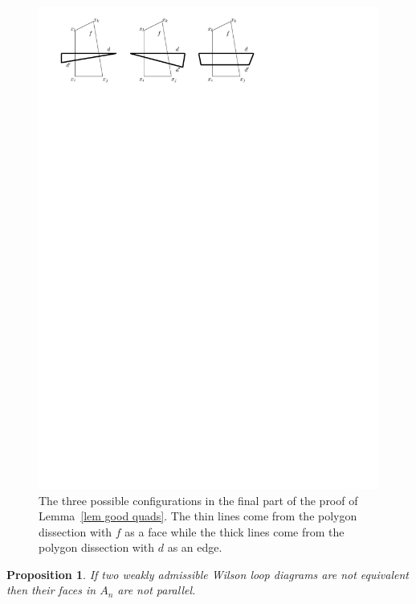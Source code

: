 \documentclass[11pt]{article}
\newtheorem{prop}[thm]{Proposition}
\theoremstyle{remark}
\theoremstyle{definition}
\begin{document}
\begin{figure}
\includegraphics{inductive_step} 
\caption{The three possible configurations in the final part of the proof of Lemma~\ref{lem good quads}.  The thin lines come from the polygon dissection with $f$ as a face while the thick lines come from the polygon dissection with $d$ as an edge.}\label{inductive_step}
\end{figure}

\begin{prop}\label{prop hard way}
  If two weakly admissible Wilson loop diagrams are not equivalent then their faces in $A_n$ are not parallel.
\end{prop}
\end{document}
